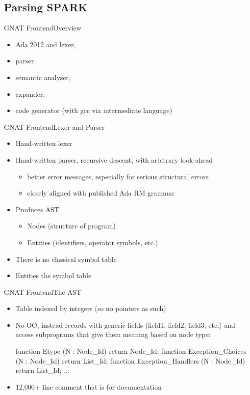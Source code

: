 \documentclass{beamer}
\begin{document}
\subsection{Parsing SPARK}
\begin{frame}{GNAT Frontend}{Overview}
  \begin{itemize}
  \item Ada 2012 and  lexer,
  \item parser,
  \item semantic analyser,
  \item expander,
  \item code generator (with gcc via intermediate language)
  \end{itemize}
\end{frame}

\begin{frame}{GNAT Frontend}{Lexer and Parser}
  \begin{itemize}
  \item Hand-written lexer
  \item Hand-written parser, recursive descent, with arbitrary look-ahead
    \begin{itemize}
    \item better error messages, especially for serious structural
      errors
    \item closely aligned with published Ada RM grammar
    \end{itemize}
  \item Produces AST
    \begin{itemize}
    \item Nodes (structure of program)
    \item Entities (identifiers, operator symbols, etc.)
    \end{itemize}
  \item There is no classical symbol table
  \item Entities  the symbol table
  \end{itemize}
\end{frame}

\begin{frame}[fragile]{GNAT Frontend}{The AST}
  \begin{itemize}
  \item Table indexed by integers (so no pointers as such)
  \item No OO, instead records with generic fields (field1, field2,
    field3, etc.) and access subprograms that give them meaning based
    on node type:
    \begin{pxcode}[language=SPARK,gobble=6]
      function Etype              (N : Node_Id) return Node_Id;
      function Exception_Choices  (N : Node_Id) return List_Id;
      function Exception_Handlers (N : Node_Id) return List_Id;
      ...
    \end{pxcode}
  \item 12,000+ line comment that is  for
    documentation
  \end{itemize}
\end{frame}
\end{document}
